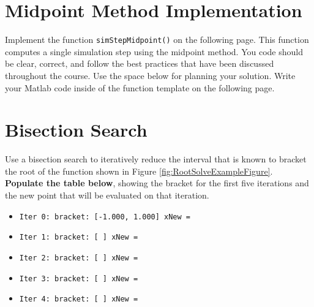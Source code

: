 
\section{Midpoint Method Implementation}

Implement the function \texttt{simStepMidpoint()} on the following page.
This function computes a single simulation step using the midpoint method.
You code should be clear, correct, and follow the best practices that
have been discussed throughout the course.
Use the space below for planning your solution.
Write your Matlab code inside of the function template on the following page.



\pagebreak
\lstset{stepnumber=0}




\pagebreak
\section{Bisection Search}
\begin{NoHyper}
Use a bisection search to iteratively reduce the interval that is known
to bracket the root of the function shown in Figure \ref{fig:RootSolveExampleFigure}.
\textbf{Populate the table below}, showing the bracket for the first five iterations
and the new point that will be evaluated on that iteration.
\end{NoHyper}
\begin{itemize}  \setlength\itemsep{0.3em}
  \item \texttt{Iter 0:   bracket: [-1.000,  \hspace{2.9em} 1.000]  \hspace{1em}  xNew = }
  \item \texttt{Iter 1:   bracket: [ \hspace{10em} ]  \hspace{1em}  xNew = }
  \item \texttt{Iter 2:   bracket: [ \hspace{10em} ]  \hspace{1em}  xNew = }
  \item \texttt{Iter 3:   bracket: [ \hspace{10em} ]  \hspace{1em}  xNew = }
  \item \texttt{Iter 4:   bracket: [ \hspace{10em} ]  \hspace{1em}  xNew = }
\end{itemize}

